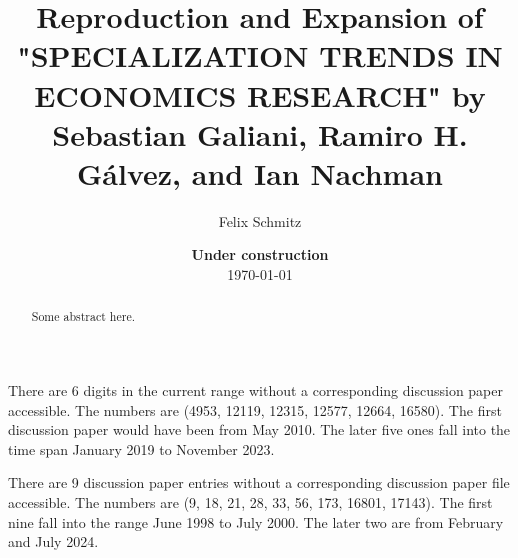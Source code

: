 \documentclass[11pt, a4paper, leqno]{article}
\begin{document}
\title{Reproduction and Expansion of \\"SPECIALIZATION TRENDS IN ECONOMICS RESEARCH" by Sebastian Galiani, Ramiro H. Gálvez, and Ian Nachman}

\author{Felix Schmitz}

\date{
    {\bf Under construction}
    \\[1ex]
    \today
}

\maketitle
{}

\begin{abstract}
    Some abstract here.
\end{abstract}

\clearpage

There are 6 digits in the current range without a corresponding discussion paper accessible.
The numbers are (4953, 12119, 12315, 12577, 12664, 16580).
The first discussion paper would have been from May 2010.
The later five ones fall into the time span January 2019 to November 2023.

There are 9 discussion paper entries without a corresponding discussion paper file accessible.
The numbers are (9, 18, 21, 28, 33, 56, 173, 16801, 17143).
The first nine fall into the range June 1998 to July 2000.
The later two are from February and July 2024.

\clearpage
\end{document}
